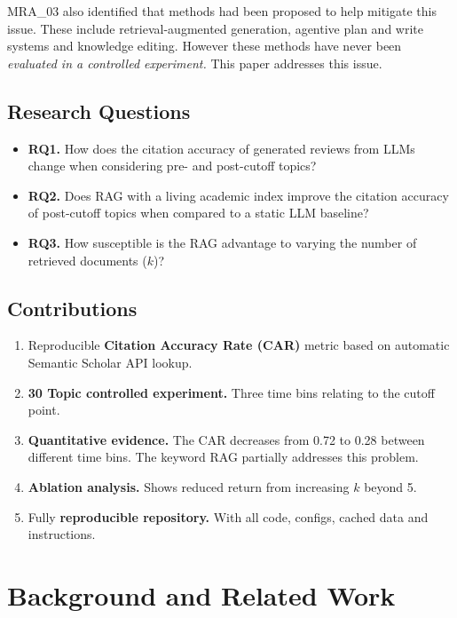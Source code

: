\documentclass[conference]{IEEEtran}
\begin{document}
MRA\_03 also identified that methods had been proposed to help mitigate this issue.
These include retrieval-augmented generation, agentive plan and write systems and knowledge editing.
However these methods have never been \emph{evaluated in a controlled experiment.}
This paper addresses this issue.

\subsection{Research Questions}

\begin{itemize}[leftmargin=*,topsep=2pt]
\item \textbf{RQ1.} How does the citation accuracy of generated reviews
from LLMs change when considering pre- and post-cutoff topics?
\item \textbf{RQ2.} Does RAG with a living academic index improve the
citation accuracy of post-cutoff topics when compared to a static LLM baseline?
\item \textbf{RQ3.} How susceptible is the RAG advantage to varying the
number of retrieved documents ($k$)?
\end{itemize}

\subsection{Contributions}

\begin{enumerate}[leftmargin=*,topsep=2pt]
\item Reproducible \textbf{Citation Accuracy Rate (CAR)} metric based on
automatic Semantic Scholar API lookup.
\item \textbf{30 Topic controlled experiment.} Three time bins relating
to the cutoff point.
\item \textbf{Quantitative evidence.} The CAR decreases from 0.72
to 0.28 between different time bins. The keyword RAG partially addresses this
problem.
\item \textbf{Ablation analysis.} Shows reduced return from increasing
$k$ beyond 5.
\item Fully \textbf{reproducible repository.} With all code, configs,
cached data and instructions.
\end{enumerate}

\section{Background and Related Work}
\label{sec:related}
\end{document}
